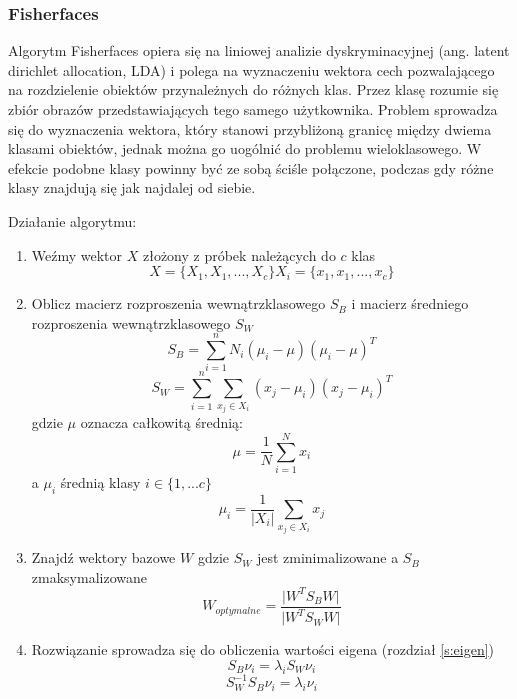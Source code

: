 \subsubsection{Fisherfaces} \label{fisher}
Algorytm Fisherfaces opiera się na liniowej analizie dyskryminacyjnej (ang. latent dirichlet allocation, LDA) i polega na wyznaczeniu wektora cech pozwalającego na rozdzielenie obiektów przynależnych do różnych klas. Przez klasę rozumie się zbiór obrazów przedstawiających tego samego użytkownika. Problem sprowadza się do wyznaczenia wektora, który stanowi przybliżoną granicę między dwiema klasami obiektów, jednak można go uogólnić do problemu wieloklasowego. W efekcie podobne klasy powinny być ze sobą ściśle połączone, podczas gdy różne klasy znajdują się jak najdalej od siebie.

Działanie algorytmu:
\begin{enumerate}
\item Weźmy wektor $X$ złożony z próbek należących do $c$ klas
\begin{equation}
X=\{X_{1},X_{1},...,X_{c}\}
X_{i}=\{x_{1},x_{1},...,x_{c}\}
\end{equation}
\item Oblicz macierz rozproszenia wewnątrzklasowego $S_{B}$ i macierz średniego rozproszenia wewnątrzklasowego $S_{W}$
\begin{equation}
S_{B}=\sum_{i=1}^{n}N_{i}(\mu_{i}-\mu)(\mu_{i}-\mu)^{T}
\end{equation}
\begin{equation}
S_{W}=\sum_{i=1}^{n}\sum_{x_{j}\in X_{i}}(x_{j}-\mu_{i})(x_{j}-\mu_{i})^{T}
\end{equation}
gdzie $\mu$ oznacza całkowitą średnią:
\begin{equation}
\mu=\frac{1}{N}\sum_{i=1}^{N}x_{i}
\end{equation}
a $\mu_{i}$ średnią klasy $i\in \{1,...c\}$
\begin{equation}
\mu_{i}=\frac{1}{|X_{i}|}\sum_{x_{j}\in X_{i}}x_{j}
\end{equation}
\item Znajdź wektory bazowe $W$ gdzie $S_{W}$ jest zminimalizowane a $S_{B}$ zmaksymalizowane
\begin{equation}
W_{optymalne}=\frac{\vert W^{T}S_{B}W\vert }{\vert W^{T}S_{W}W\vert }
\end{equation}
\item Rozwiązanie sprowadza się do obliczenia wartości eigena (rozdział \ref{s:eigen})
\begin{equation}
S_{B}\nu_{i}=\lambda_{i}S_{W}\nu_{i}
\end{equation}
\begin{equation}
S_{W}^{-1}S_{B}\nu_{i}=\lambda_{i}\nu_{i}
\end{equation}
\end{enumerate}

